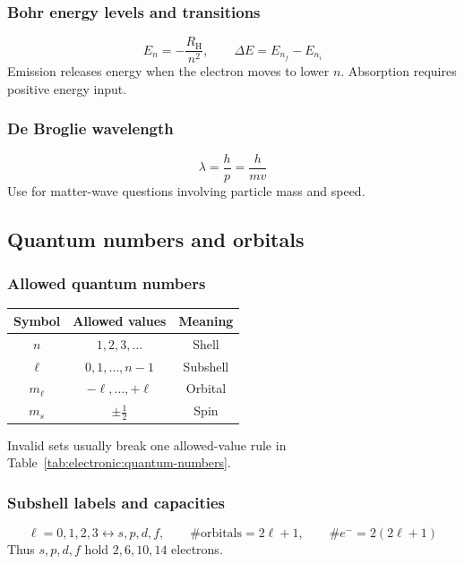 
\subsubsection{Bohr energy levels and transitions}
\begin{equation}
E_n=-\frac{R_{\mathrm H}}{n^2}, \qquad \Delta E=E_{n_f}-E_{n_i}
\label{eq:electronic:bohr-transition}
\end{equation}
Emission releases energy when the electron moves to lower \(n\). Absorption requires positive energy input.

\subsubsection{De Broglie wavelength}
\begin{equation}
\lambda=\frac{h}{p}=\frac{h}{mv}
\label{eq:electronic:de-broglie}
\end{equation}
Use for matter-wave questions involving particle mass and speed.

\subsection{Quantum numbers and orbitals}

\subsubsection{Allowed quantum numbers}
\begin{tabular}{@{}ccc@{}}
\toprule
Symbol & Allowed values & Meaning\\
\midrule
\(n\) & \(1,2,3,\ldots\) & Shell\\
\(\ell\) & \(0,1,\ldots,n-1\) & Subshell\\
\(m_\ell\) & \(-\ell,\ldots,+\ell\) & Orbital\\
\(m_s\) & \(\pm \frac12\) & Spin\\
\bottomrule
\end{tabular}
Invalid sets usually break one allowed-value rule in Table~\ref{tab:electronic:quantum-numbers}.

\subsubsection{Subshell labels and capacities}
\begin{equation}
\ell=0,1,2,3\leftrightarrow s,p,d,f, \qquad
\#\text{orbitals}=2\ell+1, \qquad
\#e^-=2(2\ell+1)
\label{eq:electronic:subshell-capacity}
\end{equation}
Thus \(s,p,d,f\) hold \(2,6,10,14\) electrons.

